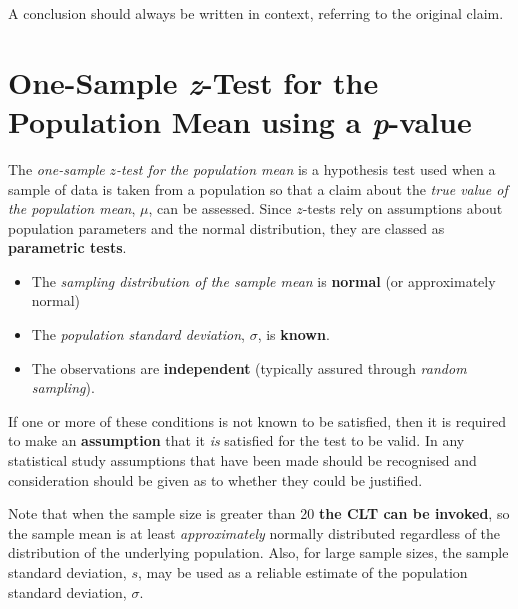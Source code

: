 \documentclass[
  11pt,
]{book}
\begin{document}
A conclusion should always be written in context, referring to the original claim.

\pagebreak

\section{\texorpdfstring{One-Sample \textit{z}-Test for the Population Mean using a \textit{p}-value}{One-Sample -Test for the Population Mean using a -value}}\label{one-sample--test-for-the-population-mean-using-a--value}

The \emph{one-sample }\(z\)\emph{-test for the population mean} is a hypothesis test used when a sample of data is taken from a population so that a claim about the \emph{true value of the population mean}, \(\mu\), can be assessed. Since \(z\)-tests rely on assumptions about population parameters and the normal distribution, they are classed as \textbf{parametric tests}.

\begin{centering}
\begin{tcolorbox}[adjusted title=Conditions for the one-sample $z$-test for the population mean:, halign title = center,colback=red!5,colframe=red!70!black, halign = center]
\begin{itemize}
    \item The \textit{sampling distribution of the sample mean} is \textbf{normal} (or approximately normal)
    \item The \textit{population standard deviation}, $\sigma$, is \textbf{known}.
    \item The observations are \textbf{independent} (typically assured through \textit{random sampling}).
\end{itemize}
\end{tcolorbox}
\end{centering}

If one or more of these conditions is not known to be satisfied, then it is required to make an \textbf{assumption} that it \emph{is} satisfied for the test to be valid. In any statistical study assumptions that have been made should be recognised and consideration should be given as to whether they could be justified.

Note that when the sample size is greater than 20 \textbf{the CLT can be invoked}, so the sample mean is at least \emph{approximately} normally distributed regardless of the distribution of the underlying population. Also, for large sample sizes, the sample standard deviation, \(s\), may be used as a reliable estimate of the population standard deviation, \(\sigma\).
\end{document}
